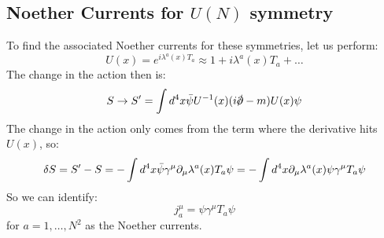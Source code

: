 \subsection{Noether Currents for $U(N)$ symmetry}
To find the associated Noether currents for these symmetries, let us perform:
\begin{equation}
    U(x) = e^{i\lambda^a(x)T_a} \approx 1 + i\lambda^a(x)T_a + \ldots
\end{equation}
The change in the action then is:
\begin{equation}
    S \to S' = \int d^4x\bar{\psi}U^{-1}(x)(i\slashed{\p} - m)U(x)\psi
\end{equation}
The change in the action only comes from the term where the derivative hits $U(x)$, so:
\begin{equation}
    \delta S = S' - S = -\int d^4x \bar{\psi}\gamma^\mu \partial_\mu \lambda^a(x)T_a \psi = -\int d^4x \partial_\mu \lambda^a(x)\psi \gamma^\mu T_a\psi
\end{equation}
So we can identify:
\begin{equation}
    j^\mu_a = \psi \gamma^\mu T_a \psi
\end{equation}
for $a = 1, \ldots, N^2$ as the Noether currents.

